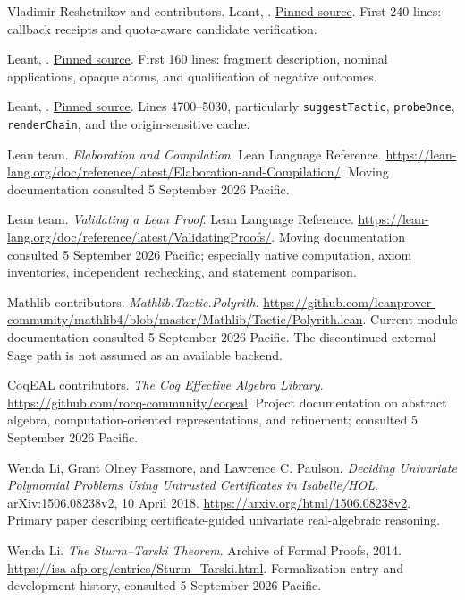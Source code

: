 \documentclass[11pt,a4paper]{article}
\newcommand{\code}[1]{\nolinkurl{#1}}
\newcommand{\source}[2]{\href{#1}{#2}}
\theoremstyle{definition}
\begin{document}
\begin{thebibliography}{99}
Vladimir Reshetnikov and contributors. Leant,
.
\source{https://github.com/VladimirReshetnikov/Leant/blob/3a40904be8a410d832d9ab6900b3d3e7b425eccb/src/Leant/Synth/Verification.hs}{Pinned source}.
First 240 lines: callback receipts and quota-aware candidate verification.

Leant, .
\source{https://github.com/VladimirReshetnikov/Leant/blob/3a40904be8a410d832d9ab6900b3d3e7b425eccb/src/Leant/Synth/Fragment.hs}{Pinned source}.
First 160 lines: fragment description, nominal applications, opaque atoms,
and qualification of negative outcomes.

Leant, .
\source{https://github.com/VladimirReshetnikov/Leant/blob/3a40904be8a410d832d9ab6900b3d3e7b425eccb/src/Main.hs}{Pinned source}.
Lines 4700--5030, particularly \code{suggestTactic}, \code{probeOnce},
\code{renderChain}, and the origin-sensitive cache.

Lean team. \emph{Elaboration and Compilation}. Lean Language Reference.
\url{https://lean-lang.org/doc/reference/latest/Elaboration-and-Compilation/}.
Moving documentation consulted 5 September 2026 Pacific.

Lean team. \emph{Validating a Lean Proof}. Lean Language Reference.
\url{https://lean-lang.org/doc/reference/latest/ValidatingProofs/}.
Moving documentation consulted 5 September 2026 Pacific; especially native
computation, axiom inventories, independent rechecking, and statement comparison.

Mathlib contributors. \emph{Mathlib.Tactic.Polyrith}.
\url{https://github.com/leanprover-community/mathlib4/blob/master/Mathlib/Tactic/Polyrith.lean}.
Current module documentation consulted 5 September 2026 Pacific. The discontinued
external Sage path is not assumed as an available backend.

CoqEAL contributors. \emph{The Coq Effective Algebra Library}.
\url{https://github.com/rocq-community/coqeal}.
Project documentation on abstract algebra, computation-oriented representations,
and refinement; consulted 5 September 2026 Pacific.

Wenda Li, Grant Olney Passmore, and Lawrence C. Paulson.
\emph{Deciding Univariate Polynomial Problems Using Untrusted Certificates in
Isabelle/HOL}. arXiv:1506.08238v2, 10 April 2018.
\url{https://arxiv.org/html/1506.08238v2}.
Primary paper describing certificate-guided univariate real-algebraic reasoning.

Wenda Li. \emph{The Sturm--Tarski Theorem}. Archive of Formal Proofs, 2014.
\url{https://isa-afp.org/entries/Sturm_Tarski.html}.
Formalization entry and development history, consulted 5 September 2026 Pacific.
\end{thebibliography}
\end{document}
